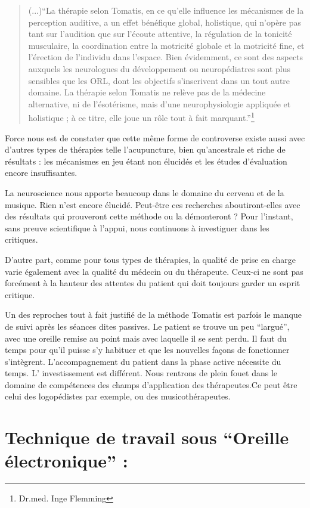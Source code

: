 \begin{quotation}
(...)``La thérapie selon Tomatis, en ce qu'elle influence les mécanismes
de la perception auditive, a un effet bénéfique global, holistique,
qui n'opère pas tant sur l'audition que sur l'écoute attentive, la
régulation de la tonicité musculaire, la coordination entre la motricité
globale et la motricité fine, et l'érection de l'individu dans l'espace.
Bien évidemment, ce sont des aspects auxquels les neurologues du développement
ou neuropédiatres sont plus sensibles que les ORL, dont les objectifs
s'inscrivent dans un tout autre domaine. La thérapie selon Tomatis
ne relève pas de la médecine alternative, ni de l'ésotérisme, mais
d'une neurophysiologie appliquée et holistique ; à ce titre, elle
joue un rôle tout à fait marquant.''\footnote{Dr.med. Inge Flemming}
\end{quotation}
Force nous est de constater que cette même forme de controverse existe
aussi avec d'autres types de thérapies telle l'acupuncture, bien qu'ancestrale
et riche de résultats : les mécanismes en jeu étant non élucidés et
les études d'évaluation encore insuffisantes. 

La neuroscience nous apporte beaucoup dans le domaine du cerveau et
de la musique. Rien n'est encore élucidé. Peut-être ces recherches
aboutiront-elles avec des résultats qui prouveront cette méthode ou
la démonteront ? Pour l'instant, sans preuve scientifique à l'appui,
nous continuons à investiguer dans les critiques.

D'autre part, comme pour tous types de thérapies, la qualité de prise
en charge varie également avec la qualité du médecin ou du thérapeute.
Ceux-ci ne sont pas forcément à la hauteur des attentes du patient
qui doit toujours garder un esprit critique.

Un des reproches tout à fait justifié de la méthode Tomatis est parfois
le manque de suivi après les séances dites passives. Le patient se trouve un peu ``largué'', avec
une oreille remise au point mais avec laquelle il se sent perdu. Il
faut du temps pour qu'il puisse s'y habituer et que les nouvelles
façons de fonctionner s'intègrent. L'accompagnement du patient dans
la phase active nécessite du temps. L' investissement est différent.
Nous rentrons de plein fouet dans le domaine de compétences des champs
d'application des thérapeutes.Ce peut être celui des logopédistes
par exemple, ou des musicothérapeutes.

\section{Technique de travail sous ``Oreille électronique'' :}

